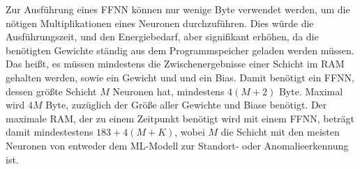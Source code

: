 \newline
\newline
Zur Ausführung eines FFNN können nur wenige Byte verwendet werden, um die nötigen Multiplikationen eines Neuronen durchzuführen.
Dies würde die Ausführungszeit, und den Energiebedarf, aber signifikant erhöhen, da die benötigten Gewichte ständig aus dem Programmspeicher geladen werden müssen.
Das heißt, es müssen mindestens die Zwischenergebnisse einer Schicht im RAM gehalten werden, sowie ein Gewicht und und ein Bias.
Damit benötigt ein FFNN, dessen größte Schicht $M$ Neuronen hat, mindestens $4(M+2)$ Byte.
Maximal wird $4M$ Byte, zuzüglich der Größe aller Gewichte und Biase benötigt.
Der maximale RAM, der zu einem Zeitpunkt benötigt wird mit einem FFNN, beträgt damit mindestestens $183 + 4(M + K)$,
wobei $M$ die Schicht mit den meisten Neuronen von entweder dem ML-Modell zur Standort- oder Anomalieerkennung ist.